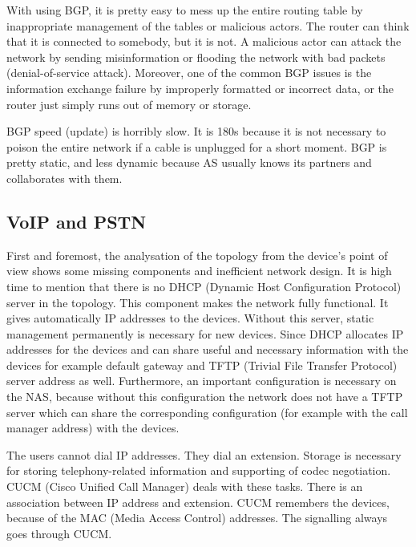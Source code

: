 \documentclass{article}
\begin{document}
With using BGP, it is pretty easy to mess up the entire routing table by inappropriate management of the tables or malicious actors. The router can think that it is connected to somebody, but it is not. A malicious actor can attack the network by sending misinformation or flooding the network with bad packets (denial-of-service attack). Moreover, one of the common BGP issues is the information exchange failure by improperly formatted or incorrect data, or the router just simply runs out of memory or storage.

BGP speed (update) is horribly slow. It is 180s because it is not necessary to poison the entire network if a cable is unplugged for a short moment. BGP is pretty static, and less dynamic because AS usually knows its partners and collaborates with them.
\subsection{VoIP and PSTN}
First and foremost, the analysation of the topology from the device's point of view shows some missing components and inefficient network design. It is high time to mention that there is no DHCP (Dynamic Host Configuration Protocol) server in the topology. This component makes the network fully functional. It gives automatically IP addresses to the devices. Without this server, static management permanently is necessary for new devices. Since DHCP allocates IP addresses for the devices and can share useful and necessary information with the devices for example default gateway and TFTP (Trivial File Transfer Protocol) server address as well. Furthermore, an important configuration is necessary on the NAS, because without this configuration the network does not have a TFTP server which can share the corresponding configuration (for example with the call manager address) with the devices.

The users cannot dial IP addresses. They dial an extension. Storage is necessary for storing telephony-related information and supporting of codec negotiation. CUCM (Cisco Unified Call Manager) deals with these tasks. There is an association between IP address and extension. CUCM remembers the devices, because of the MAC (Media Access Control) addresses. The signalling always goes through CUCM.
\end{document}
